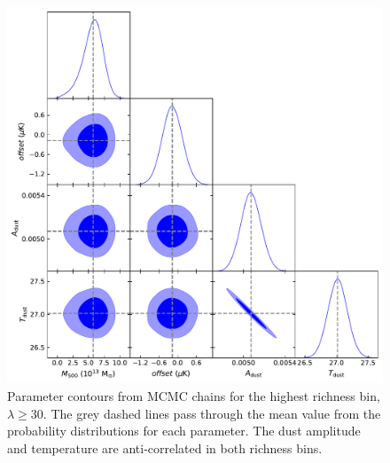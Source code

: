 \documentclass[a4paper,fleqn,usenatbib]{mnras}
\begin{document}
\begin{figure}
  \centering
  \includegraphics[width= \columnwidth] {corner_0180808_nw_12_ns_10000_mbat_tophat_11_arcmin_zbin01_rbin2_cut_1000.pdf}
  \caption{Parameter contours from MCMC chains for the highest richness bin, $\lambda \geq 30$. The grey dashed lines pass through the mean value from the probability distributions for each parameter. The dust amplitude and temperature are anti-correlated in both richness bins.}  \label{fig:mcmccontours}
\end{figure}

\end{document}
